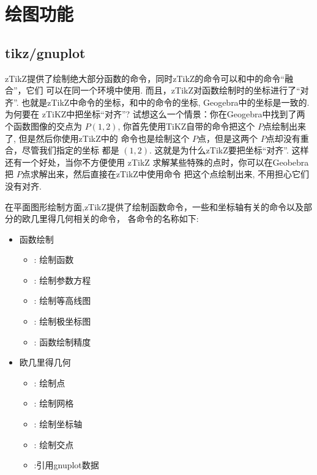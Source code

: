 \section{绘图功能}
\subsection{tikz/gnuplot}
zTikZ提供了绘制绝大部分函数的命令，同时zTikZ的命令可以和中的命令``融合''，它们
可以在同一个环境中使用. 而且，zTikZ对函数绘制时的坐标进行了``对齐''. 
也就是zTikZ中命令的坐标，和中的命令的坐标, Geogebra中的坐标是一致的. 为何要在
zTiKZ中把坐标``对齐''? 试想这么一个情景：你在Geogebra中找到了两个函数图像的交点为 $P(1, 2)$,
你首先使用TiKZ自带的\cmd{\filldraw}命令把这个 $P$点绘制出来了, 但是然后你使用zTikZ中的
\cmd{\ShowPoint}命令也是绘制这个 $P$点，但是这两个 $P$点却没有重合，尽管我们指定的坐标
都是 $(1, 2)$. 这就是为什么zTikZ要把坐标``对齐''. 这样还有一个好处，当你不方便使用 zTikZ 
求解某些特殊的点时，你可以在Geobebra把 $P$点求解出来，然后直接在zTikZ中使用\cmd{\ShowPoint}命令
把这个点绘制出来, 不用担心它们没有对齐.

在平面图形绘制方面,zTikZ提供了绘制函数命令，一些和坐标轴有关的命令以及部分的欧几里得几何相关的命令，
各命令的名称如下:

\begin{multicols}{2}
\begin{itemize}
    \item 函数绘制
        \begin{itemize}
            \item \cmd{\Plot}\index{\cmd{\Plot}}: 绘制函数
            \item \cmd{\ParamPlot}\index{\cmd{\ParamPlot}}: 绘制参数方程
            \item \cmd{\ContourPlot}\index{\cmd{\ContourPlot}}: 绘制等高线图
            \item \cmd{\PolarPlot}\index{\cmd{\PolarPlot}}: 绘制极坐标图
            \item \cmd{\PlotPrecise}\index{\cmd{\PlotPrecise}}: 函数绘制精度
        \end{itemize}
    \item 欧几里得几何 
        \begin{itemize}
            \item \cmd{\ShowPoint}\index{\cmd{\ShowPoint}}: 绘制点
            \item \cmd{\ShowGrid}\index{\cmd{\ShowGrid}}: 绘制网格 
            \item \cmd{\ShowAxis}\index{\cmd{\ShowAxis}}: 绘制坐标轴
            \item \cmd{\ShowIntersection}\index{\cmd{\ShowIntersection}}: 绘制交点
            \item \cmd{\gnudata}\index{\cmd{\gnudata}}:引用gnuplot数据
        \end{itemize}
\end{itemize}
\end{multicols}

